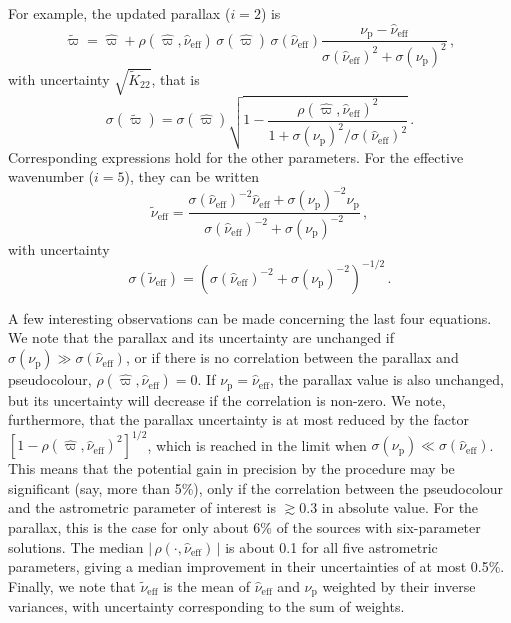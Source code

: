 \documentclass[longauth]{aa} %
\begin{document}
For example, the updated parallax ($i=2$) is
\begin{equation}\label{eq:varpiTilde}
\widetilde{\varpi} = \hat{\varpi}+\rho(\hat{\varpi},\hat{\nu}_\text{eff})\,\sigma(\hat{\varpi})\,\sigma(\hat{\nu}_\text{eff})
\frac{\nu_\text{p}-\hat{\nu}_\text{eff}}{\sigma(\hat{\nu}_\text{eff})^2+\sigma(\nu_\text{p})^2}\, ,
\end{equation}
with uncertainty $\sqrt{\widetilde{K}_{22}}$, that is
\begin{equation}\label{eq:varVarpiTilde}
\sigma(\widetilde{\varpi}) = \sigma(\hat{\varpi})
\sqrt{1 - \frac{\rho(\hat{\varpi},\hat{\nu}_\text{eff})^2}{1+\sigma(\nu_\text{p})^2/\sigma(\hat{\nu}_\text{eff})^2}}\, . 
\end{equation}
Corresponding expressions hold for the other parameters. For the effective wavenumber ($i=5$),
they can be written
\begin{equation}\label{eq:nuTilde}
\widetilde{\nu}_\text{eff} = \frac{\sigma(\hat{\nu}_\text{eff})^{-2}\hat{\nu}_\text{eff}+
\sigma(\nu_\text{p})^{-2}\nu_\text{p}}{\sigma(\hat{\nu}_\text{eff})^{-2}+\sigma(\nu_\text{p})^{-2}} \, ,
\end{equation}
with uncertainty
\begin{equation}\label{eq:varNuTilde}
\sigma(\widetilde{\nu}_\text{eff}) = \left(\sigma(\hat{\nu}_\text{eff})^{-2}+\sigma(\nu_\text{p})^{-2}\right)^{-1/2}\, . 
\end{equation}

A few interesting observations can be made concerning the last four equations.
We note that the parallax and its uncertainty are unchanged if 
$\sigma(\nu_\text{p})\gg\sigma(\hat{\nu}_\text{eff})$,
or if there is no correlation between the parallax and pseudocolour, $\rho(\hat{\varpi},\hat{\nu}_\text{eff})=0$. If $\nu_\text{p}=\hat{\nu}_\text{eff}$, the parallax value is also unchanged, 
but its uncertainty will decrease if the correlation is non-zero.
We note, furthermore, that the parallax uncertainty is at most reduced by the factor 
$[1-\rho(\hat{\varpi},\hat{\nu}_\text{eff})^2]^{1/2}$, which is 
reached in the limit when $\sigma(\nu_\text{p})\ll\sigma(\hat{\nu}_\text{eff})$.
This means that the potential gain in precision by the procedure 
may be significant (say, more than 5\%),
only if the correlation between the pseudocolour and the astrometric parameter of interest is 
$\gtrsim 0.3$ in absolute value. For the parallax, this is the case for only about 6\% of the sources with 
six-parameter solutions. The median $|\,\rho(\cdot,\hat{\nu}_\text{eff})\,|$ is about 0.1 for all five
astrometric parameters, giving a median improvement in their uncertainties of at most 0.5\%. 
Finally, we note that $\widetilde{\nu}_\text{eff}$ is the mean of $\hat{\nu}_\text{eff}$ 
and $\nu_\text{p}$ weighted by their
inverse variances, with uncertainty corresponding to the sum of weights.
\end{document}
